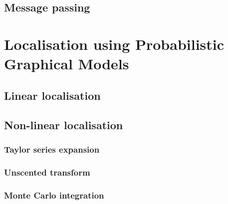 \documentclass[12pt,oneside,openany,a4paper, %
afrikaans,english,
]{memoir}
\numberwithin{equation}{chapter}
\begin{document}
\section{Message passing}
\chapter{Localisation using Probabilistic Graphical Models}
\section{Linear localisation}
\section{Non-linear localisation}
\subsection{Taylor series expansion}
\subsection{Unscented transform}
\subsection{Monte Carlo integration}

\backmatter
{}
\end{document}
